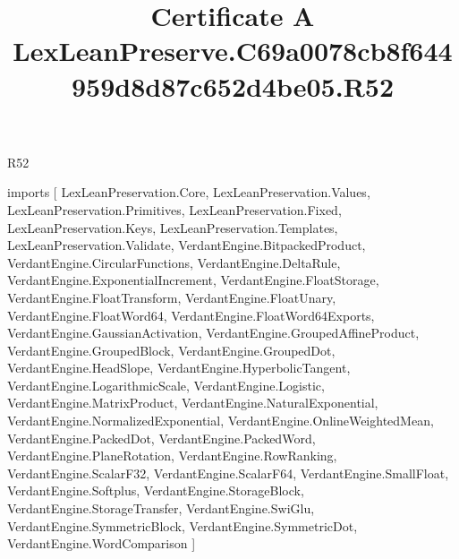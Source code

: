 \begin{lexlean}{R52}
\title{Certificate A LexLeanPreserve.C69a0078cb8f644959d8d87c652d4be05.R52}
\begin{coremodule}
imports [
  LexLeanPreservation.Core,
  LexLeanPreservation.Values,
  LexLeanPreservation.Primitives,
  LexLeanPreservation.Fixed,
  LexLeanPreservation.Keys,
  LexLeanPreservation.Templates,
  LexLeanPreservation.Validate,
  VerdantEngine.BitpackedProduct,
  VerdantEngine.CircularFunctions,
  VerdantEngine.DeltaRule,
  VerdantEngine.ExponentialIncrement,
  VerdantEngine.FloatStorage,
  VerdantEngine.FloatTransform,
  VerdantEngine.FloatUnary,
  VerdantEngine.FloatWord64,
  VerdantEngine.FloatWord64Exports,
  VerdantEngine.GaussianActivation,
  VerdantEngine.GroupedAffineProduct,
  VerdantEngine.GroupedBlock,
  VerdantEngine.GroupedDot,
  VerdantEngine.HeadSlope,
  VerdantEngine.HyperbolicTangent,
  VerdantEngine.LogarithmicScale,
  VerdantEngine.Logistic,
  VerdantEngine.MatrixProduct,
  VerdantEngine.NaturalExponential,
  VerdantEngine.NormalizedExponential,
  VerdantEngine.OnlineWeightedMean,
  VerdantEngine.PackedDot,
  VerdantEngine.PackedWord,
  VerdantEngine.PlaneRotation,
  VerdantEngine.RowRanking,
  VerdantEngine.ScalarF32,
  VerdantEngine.ScalarF64,
  VerdantEngine.SmallFloat,
  VerdantEngine.Softplus,
  VerdantEngine.StorageBlock,
  VerdantEngine.StorageTransfer,
  VerdantEngine.SwiGlu,
  VerdantEngine.SymmetricBlock,
  VerdantEngine.SymmetricDot,
  VerdantEngine.WordComparison
]


\end{coremodule}
\end{lexlean}
